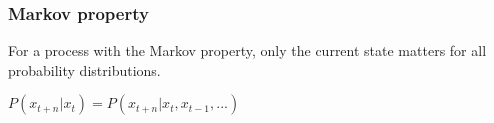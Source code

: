 
\subsubsection{Markov property}

For a process with the Markov property, only the current state matters for all probability distributions.

\(P(x_{t+n}|x_t)=P(x_{t+n}|x_t, x_{t-1},...)\)

